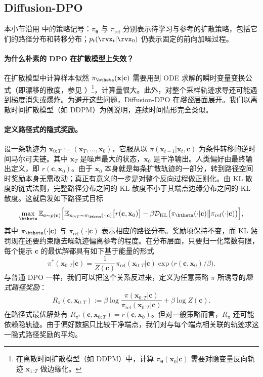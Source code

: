 \subsection{Diffusion-DPO}\label{subsec:diffusion-dpo}
本小节沿用  中的策略记号：$\pi_{\bm\theta}$ 与 $\pi_{\mathrm{ref}}$ 分别表示待学习与参考的扩散策略，包括它们的路径分布和转移分布；$p_t(\rvx_t|\rvx_0)$ 仍表示固定的前向加噪过程。
\paragraph{为什么朴素的 DPO 在扩散模型上失效？}
在扩散模型中计算样本似然 $\pi_\btheta(\mathbf x|\mathbf c)$ 需要用到 ODE 求解的瞬时变量变换公式（即漂移的散度，参见 ）\footnote{在离散时间扩散模型（如 DDPM）中，计算 $\pi_{\bm\theta}(\mathbf x_0| \mathbf c)$ 需要对隐变量反向轨迹 $\mathbf x_{1:T}$ 做边缘化。}，计算量很大。此外，对整个采样轨迹求导还可能遇到梯度消失或爆炸。为避开这些问题，Diffusion-DPO 在\emph{路径}层面展开。我们以离散时间扩散模型（如 DDPM）为例说明，连续时间情形完全类似。

\paragraph{定义路径式的隐式奖励。}
设一条轨迹为 $\mathbf x_{0:T}:=(\mathbf x_T,\ldots,\mathbf x_0)$，它服从以 $\pi(\mathbf x_{t-1}|\mathbf x_t,\mathbf c)$ 为条件转移的逆时间马尔可夫链。其中 $\mathbf x_T$ 是噪声最大的状态，$\mathbf x_0$ 是干净输出。人类偏好由最终输出定义，即 $r(\mathbf c,\mathbf x_0)$。由于 $\mathbf x_0$ 本身就是每条扩散轨迹的一部分，转到路径空间时奖励本身无需改动；真正有意义的一步是对整个反向过程做正则化。由 KL 散度的链式法则，完整路径分布之间的 KL 散度不小于其端点边缘分布之间的 KL 散度。这就启发如下路径式目标
\[
\max_{\btheta}\mathbb E_{\mathbf c\sim p(\mathbf c)}
\Big[
\mathbb E_{\mathbf x_{0:T}\sim\pi_{\btheta}(\cdot|\mathbf c)}
\big[r(\mathbf c,\mathbf x_0)\big]
-\beta
\mathcal D_{\mathrm{KL}}
\big(
\pi_{\btheta}(\cdot|\mathbf c)
\big\|
\pi_{\mathrm{ref}}(\cdot|\mathbf c)
\big)
\Big],
\]
其中 $\pi_{\btheta}(\cdot|\mathbf c)$ 与 $\pi_{\mathrm{ref}}(\cdot|\mathbf c)$ 表示相应的路径分布。奖励项保持不变，而 KL 惩罚现在还要约束隐去噪轨迹偏离参考的程度。在分布层面，只要归一化常数有限，每个提示 $\mathbf c$ 的最优解都具有如下基于能量的形式
\begin{equation}\label{eq:path-closed-form}
\pi^*(\mathbf x_{0:T}|\mathbf c)
=
\frac{1}{Z(\mathbf c)}
\pi_{\mathrm{ref}}(\mathbf x_{0:T}|\mathbf c)
\exp\big(r(\mathbf c,\mathbf x_0)/\beta\big).
\end{equation}
与普通 DPO 一样，我们可以把这个关系反过来，定义为任意策略 $\pi$ 所诱导的\emph{隐式路径奖励}：
\[
R_{\pi}(\mathbf c,\mathbf x_{0:T})
:=
\beta\log
\frac{\pi(\mathbf x_{0:T}|\mathbf c)}
{\pi_{\mathrm{ref}}(\mathbf x_{0:T}|\mathbf c)}
+\beta\log Z(\mathbf c).
\]
在路径式最优解处有 $R_{\pi^*}(\mathbf c,\mathbf x_{0:T})=r(\mathbf c,\mathbf x_0)$。但对一般策略而言，$R_{\pi}$ 还可能依赖隐轨迹。由于偏好数据只比较干净端点，我们对与每个端点相关联的轨迹求这一隐式路径奖励的平均。

